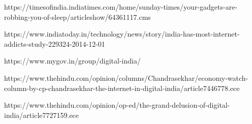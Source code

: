 \documentclass[a4paper, 11pt]{article}
\begin{document}
\begin{thebibliography}{X}
  https://timesofindia.indiatimes.com/home/sunday-times/your-gadgets-are-robbing-you-of-sleep/articleshow/64361117.cms

  https://www.indiatoday.in/technology/news/story/india-has-most-internet-addicts-study-229324-2014-12-01

  https://www.mygov.in/group/digital-india/

  https://www.thehindu.com/opinion/columns/Chandrasekhar/economy-watch-column-by-cp-chandrasekhar-the-internet-in-digital-india/article7446778.ece

  https://www.thehindu.com/opinion/op-ed/the-grand-delusion-of-digital-india/article7727159.ece

\end{thebibliography}
\end{document}
